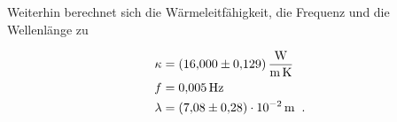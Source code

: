         \noindent Weiterhin berechnet sich die Wärmeleitfähigkeit, die Frequenz und die Wellenlänge zu

        \begin{align*}
          \kappa &= \SI{16.0 \pm 0.129}{\watt\per\metre\per\kelvin}\\
          f &= \SI{0.005}{\hertz}\\
          \lambda &= \SI{7.08(28)e-2}{\metre} \; \; .
        \end{align*}








        









